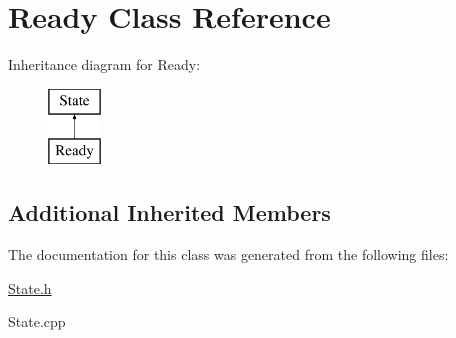 \hypertarget{class_ready}{}\section{Ready Class Reference}
\label{class_ready}
Inheritance diagram for Ready\+:\begin{figure}[H]
\begin{center}
\leavevmode
\includegraphics[height=2.000000cm]{class_ready}
\end{center}
\end{figure}
\subsection*{Additional Inherited Members}


The documentation for this class was generated from the following files\+:\begin{DoxyCompactItemize}
\item 
\mbox{\hyperlink{_state_8h}{State.\+h}}\item 
State.\+cpp\end{DoxyCompactItemize}
